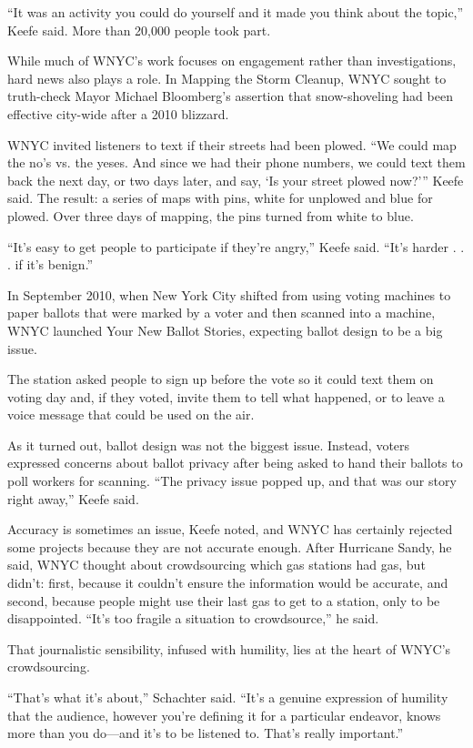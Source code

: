\begin{itemize}
\begin{itemize}
\begin{enumerate}
{“It was an activity you could do yourself and it made you think about the topic,” Keefe said. More than 20,000 people took part.

While much of WNYC’s work focuses on engagement rather than investigations, hard news also plays a role. In Mapping the Storm Cleanup, WNYC sought to truth-check Mayor Michael Bloomberg’s assertion that snow-shoveling had been effective city-wide after a 2010 blizzard.\autocite{Storm} 

WNYC invited listeners to text if their streets had been plowed. “We could map the no’s vs. the yeses. And since we had their phone numbers, we could text them back the next day, or two days later, and say, ‘Is your street plowed now?’” Keefe said. The result: a series of maps with pins, white for unplowed and blue for plowed. Over three days of mapping, the pins turned from white to blue. 

“It’s easy to get people to participate if they’re angry,” Keefe said. “It’s harder . . . if it’s benign.”

In September 2010, when New York City shifted from using voting machines to paper ballots that were marked by a voter and then scanned into a machine, WNYC launched Your New Ballot Stories, expecting ballot 
design to be a big issue.\autocite{Ballot} 

The station asked people to sign up before the vote so it could text them on voting day and, if they voted, invite them to tell what happened, or to leave a voice message that could be used on the air. 

As it turned out, ballot design was not the biggest issue. Instead, voters expressed concerns about ballot privacy after being asked to hand their ballots to poll workers for scanning. “The privacy issue popped up, and that was our story right away,” Keefe said.

Accuracy is sometimes an issue, Keefe noted, and WNYC has certainly rejected some projects because they are not accurate enough. After Hurricane Sandy, he said, WNYC thought about crowdsourcing which gas stations had gas, but didn’t: first, because it couldn’t ensure the information would be accurate, and second, because people might use their last gas to get to a station, only to be disappointed. “It’s too fragile a situation to crowdsource,” he said. 

That journalistic sensibility, infused with humility, lies at the heart of WNYC’s crowdsourcing.

“That’s what it’s about,” Schachter said. “It’s a genuine expression of humility that the audience, however you’re defining it for a particular endeavor, knows more than you do---and it’s to be listened to. That’s really important.”

}
\end{enumerate}
\end{itemize}
\end{itemize}
